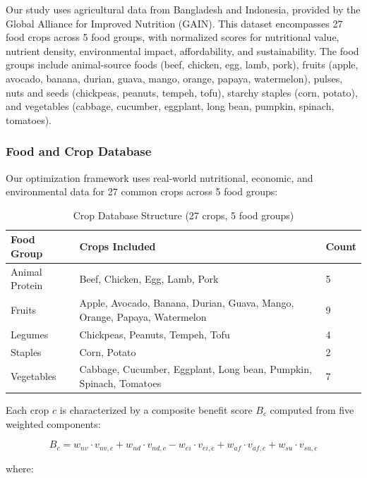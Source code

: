 \documentclass{oqireport}
\begin{document}
Our study uses agricultural data from Bangladesh and Indonesia, provided by the Global Alliance for Improved Nutrition (GAIN). This dataset encompasses 27 food crops across 5 food groups, with normalized scores for nutritional value, nutrient density, environmental impact, affordability, and sustainability. The food groups include animal-source foods (beef, chicken, egg, lamb, pork), fruits (apple, avocado, banana, durian, guava, mango, orange, papaya, watermelon), pulses, nuts and seeds (chickpeas, peanuts, tempeh, tofu), starchy staples (corn, potato), and vegetables (cabbage, cucumber, eggplant, long bean, pumpkin, spinach, tomatoes).


\subsubsection{Food and Crop Database}

Our optimization framework uses real-world nutritional, economic, and environmental data for 27 common crops across 5 food groups:

\begin{table}[H]
\centering
\caption{Crop Database Structure (27 crops, 5 food groups)}
\label{tab:crop_database}
\small
\begin{tabular}{p{3cm}p{8cm}l}
\toprule
\textbf{Food Group} & \textbf{Crops Included} & \textbf{Count} \\
\midrule
Animal Protein & Beef, Chicken, Egg, Lamb, Pork & 5 \\
Fruits & Apple, Avocado, Banana, Durian, Guava, Mango, Orange, Papaya, Watermelon & 9 \\
Legumes & Chickpeas, Peanuts, Tempeh, Tofu & 4 \\
Staples & Corn, Potato & 2 \\
Vegetables & Cabbage, Cucumber, Eggplant, Long bean, Pumpkin, Spinach, Tomatoes & 7 \\
\bottomrule
\end{tabular}
\end{table}

Each crop $c$ is characterized by a composite benefit score $B_c$ computed from five weighted components:

\begin{equation}
B_c = w_{nv} \cdot v_{nv,c} + w_{nd} \cdot v_{nd,c} - w_{ei} \cdot v_{ei,c} + w_{af} \cdot v_{af,c} + w_{su} \cdot v_{su,c}
\end{equation}

where:
\end{document}
